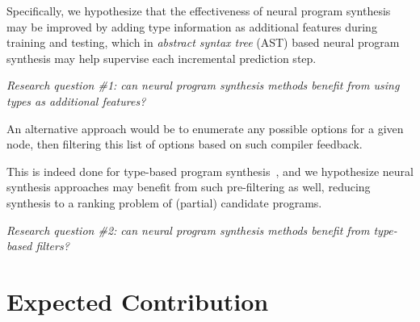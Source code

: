 \documentclass{article}
\begin{document}
Specifically, we hypothesize that the effectiveness of neural program synthesis may be improved by
adding type information as additional features during training and testing,
which in \emph{abstract syntax tree} (AST) based neural program synthesis may help supervise each incremental prediction step.

\begin{displayquote} %
    \emph{Research question \#1: can neural program synthesis methods benefit from using types as additional features?}
\end{displayquote}

An alternative approach would be to enumerate any possible options for a given node,
then filtering this list of options based on such compiler feedback.%

This is indeed done for type-based program synthesis~\citep{myth},
and we hypothesize neural synthesis approaches may benefit from such pre-filtering as well,
reducing synthesis to a ranking problem of (partial) candidate programs.

\begin{displayquote} \label{hyp:filter}
    \emph{Research question \#2: can neural program synthesis methods benefit from type-based filters?
    }
\end{displayquote}


\section{Expected Contribution} %
\end{document}
